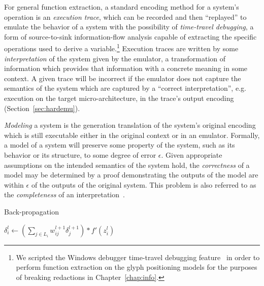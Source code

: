 For general function extraction, a standard encoding method for a system's operation is an \emph{execution trace}, which can be recorded and then ``replayed'' to emulate the behavior of a system with the possibility of \emph{time-travel debugging}, a form of source-to-sink information-flow analysis capable of extracting the specific operations used to derive a variable.\footnote{
	We scripted the Windows debugger time-travel debugging feature~\cite{timetravel} in order to perform function extraction on the glyph positioning models for the purposes of breaking redactions in Chapter~\ref{chap:info}.}
Execution traces are written by some \emph{interpretation} of the system given by the emulator, a transformation of information which provides that information with a concrete meaning in some context.
A given trace will be incorrect if the emulator does not capture the semantics of the system which are captured by a ``correct interpretation'', e.g. execution on the target micro-architecture, in the trace's output encoding (Section~\ref{sec:hardemu}).

\emph{Modeling} a system is the generation translation of the system's original encoding which is still executable either in the original context or in an emulator.
Formally, a model of a system will preserve some property of the system, such as its behavior or its structure, to some degree of error $\epsilon$.
Given appropriate assumptions on the intended semantics of the system hold, the \emph{correctness} of a model may be determined by a proof demonstrating the outputs of the model are within $\epsilon$ of the outputs of the original system.
This problem is also referred to as the \emph{completeness} of an interpretation~\cite{campion2022partial}.

\begin{algorithm}
\caption{Back-propagation}
\label{alg:backprop}
\begin{algorithmic}[1]
		\State $\delta_{i}^{l} \gets (\sum_{j \in L_{i}} w_{ij}^{l+1} \delta_{j}^{l+1}) * f'(z_{i}^{l})$
	\EndFor
\EndFor
\EndProcedure
\end{algorithmic}
\end{algorithm}



